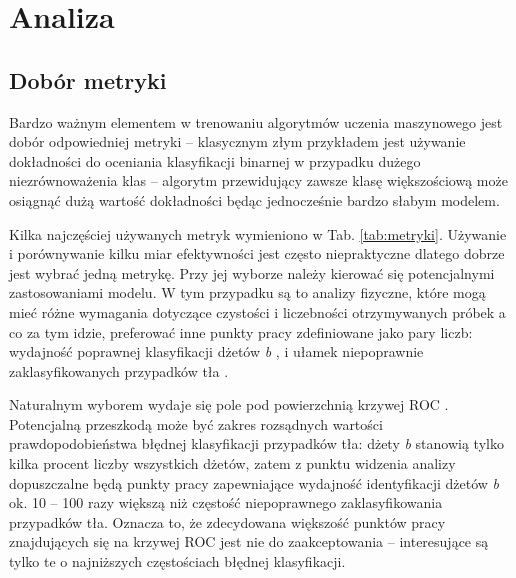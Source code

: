 \section{Analiza}
\label{sec:analiza}


\subsection{Dobór metryki}

Bardzo ważnym elementem w trenowaniu algorytmów uczenia maszynowego jest dobór odpowiedniej metryki -- klasycznym złym przykładem jest używanie dokładności  do oceniania klasyfikacji binarnej w przypadku dużego niezrównoważenia klas -- algorytm przewidujący zawsze klasę większościową może osiągnąć dużą wartość dokładności będąc jednocześnie bardzo słabym modelem.

Kilka najczęściej używanych metryk wymieniono w Tab. \ref{tab:metryki}. Używanie i porównywanie kilku miar efektywności jest często niepraktyczne dlatego dobrze jest wybrać jedną metrykę. Przy jej wyborze należy kierować się potencjalnymi zastosowaniami modelu. W tym przypadku są to analizy fizyczne, które mogą mieć różne wymagania dotyczące czystości i liczebności otrzymywanych próbek a co za tym idzie, preferować inne punkty pracy zdefiniowane jako pary liczb: wydajność poprawnej klasyfikacji dżetów \textit{b} , i ułamek niepoprawnie zaklasyfikowanych przypadków tła . 

Naturalnym wyborem wydaje się pole pod powierzchnią krzywej ROC  \cite{bradley1997use}. Potencjalną przeszkodą może być zakres rozsądnych wartości prawdopodobieństwa błędnej klasyfikacji przypadków tła: dżety \textit{b} stanowią tylko kilka procent liczby wszystkich dżetów, zatem z punktu widzenia analizy dopuszczalne będą punkty pracy zapewniające wydajność identyfikacji dżetów \textit{b} ok. 10 -- 100 razy większą niż częstość niepoprawnego zaklasyfikowania przypadków tła. Oznacza to, że zdecydowana większość punktów pracy znajdujących się na krzywej ROC jest nie do zaakceptowania -- interesujące są tylko te o najniższych częstościach błędnej klasyfikacji.

